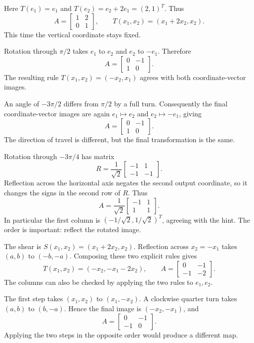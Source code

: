 Here $T(e_1)=e_1$ and $T(e_2)=e_2+2e_1=(2,1)^T$.
Thus
\[
 A=\begin{bmatrix}1&2\\0&1\end{bmatrix},\qquad
 T(x_1,x_2)=(x_1+2x_2,x_2).
\]
This time the vertical coordinate stays fixed.

Rotation through $\pi/2$ takes $e_1$ to $e_2$ and $e_2$ to
$-e_1$. Therefore
\[
 A=\begin{bmatrix}0&-1\\1&0\end{bmatrix}.
\]
The resulting rule $T(x_1,x_2)=(-x_2,x_1)$ agrees with both
coordinate-vector images.

An angle of $-3\pi/2$ differs from $\pi/2$ by a full turn.
Consequently the final coordinate-vector images are again
$e_1\mapsto e_2$ and $e_2\mapsto-e_1$, giving
\[
 A=\begin{bmatrix}0&-1\\1&0\end{bmatrix}.
\]
The direction of travel is different, but the final transformation is the same.

Rotation through $-3\pi/4$ has matrix
\[
 R=\frac1{\sqrt2}\begin{bmatrix}-1&1\\-1&-1\end{bmatrix}.
\]
Reflection across the horizontal axis negates the second output
coordinate, so it changes the signs in the second row of $R$.
Thus
\[
 A=\frac1{\sqrt2}\begin{bmatrix}-1&1\\1&1\end{bmatrix}.
\]
In particular the first column is $(-1/\sqrt2,1/\sqrt2)^T$, agreeing
with the hint. The order is important: reflect the rotated image.

The shear is $S(x_1,x_2)=(x_1+2x_2,x_2)$.
Reflection across $x_2=-x_1$ takes $(a,b)$ to $(-b,-a)$.
Composing these two explicit rules gives
\[
 T(x_1,x_2)=(-x_2,-x_1-2x_2),\qquad
 A=\begin{bmatrix}0&-1\\-1&-2\end{bmatrix}.
\]
The columns can also be checked by applying the two rules to $e_1,e_2$.

The first step takes $(x_1,x_2)$ to $(x_1,-x_2)$.
A clockwise quarter turn takes $(a,b)$ to $(b,-a)$. Hence the
final image is $(-x_2,-x_1)$, and
\[
 A=\begin{bmatrix}0&-1\\-1&0\end{bmatrix}.
\]
Applying the two steps in the opposite order would produce a different map.

